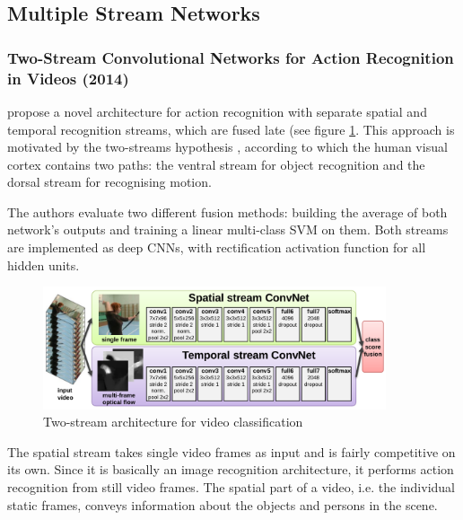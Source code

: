 \newpage
\subsection{Multiple Stream Networks}

\subsubsection{Two-Stream Convolutional Networks for Action Recognition in Videos (2014)}

\textcite{simonyan_two-stream_2014} propose a novel architecture for action recognition with separate spatial and temporal recognition streams, which are fused late (see figure \ref{fig:twostream_architecture}.
This approach is motivated by the two-streams hypothesis \cite{goodale_separate_1992}, according to which the human visual cortex contains two paths: the ventral stream for object recognition and the dorsal stream for recognising motion.

The authors evaluate two different fusion methods: building the average of both network's outputs and training a linear multi-class SVM on them.
Both streams are implemented as deep CNNs, with rectification activation function for all hidden units.

\begin{figure}[H]
    \centering
    \includegraphics[width=0.9\textwidth]{img_deep/twostream_architecture}
    \caption{Two-stream architecture for video classification \cite{simonyan_two-stream_2014}}
    \label{fig:twostream_architecture}
\end{figure}

The spatial stream takes single video frames as input and is fairly competitive on its own.
Since it is basically an image recognition architecture, it performs action recognition from still video frames.
The spatial part of a video, i.e. the individual static frames, conveys information about the objects and persons in the scene.

